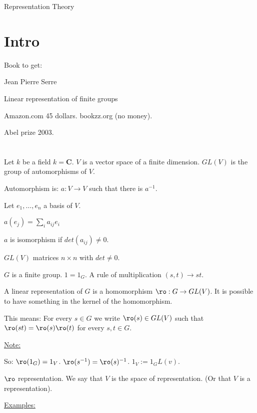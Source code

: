 Representation Theory

\part{Intro}

Book to get:

Jean Pierre Serre

Linear representation of finite groups

Amazon.com 45 dollars.
bookzz.org (no money).

Abel prize 2003.


\part{}

Let $k$ be a field $k=\mathbf{C}$. $V$ is a vector space of a finite dimension.
$GL(V)$ is the group of automorphisms of $V$.

Automorphism is:
$a: V \rightarrow V$ such that there is $a^{-1}$.

Let $e_1,\dots,e_n$ a basis of $V$.

$a(e_j) = \sum_{i} a_{ij}e_i$

$a$ is isomorphism if $det(a_{ij}) \neq 0$.

$GL(V)$ matrices $n\times n$ with $det \neq 0$.


$G$ is a finite group. $1 = 1_G$. A rule of multiplication $(s,t) \rightarrow
st$.

\begin{defn}
  A linear representation of $G$ is a homomorphism $\ro : G \rightarrow GL(V)$.
  It is possible to have something in the kernel of the homomorphism.

  This means: For every $s \in G$ we write $\ro(s) \in GL(V)$ such that $\ro(st)
  = \ro(s)\ro(t)$ for every $s,t \in G$.
\end{defn}

\uline{Note:}

So:
$\ro(1_G) = 1_V$.
$\ro(s^{-1}) = \ro(s)^{-1}$.
$1_V := 1_GL(v)$.


$\ro$ representation. We say that $V$ is the space of representation. (Or that
$V$ is a representation).

\uline{Examples:}

